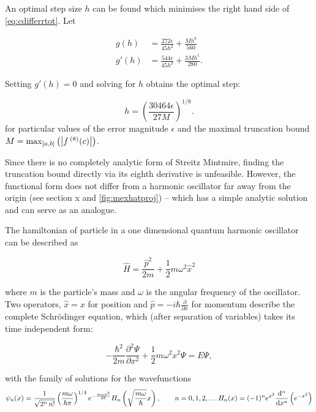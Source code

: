 An optimal step size $h$ can be found which minimises the right hand side of \cref{eq:cdifferrtot}. Let

\begin{align}
g(h) &= \frac{272\epsilon}{45h^2}+\frac{Mh^6}{560}\\[0.2cm]
g'(h) &= \frac{544\epsilon}{45h^3}+\frac{3Mh^5}{280}.
\end{align}

Setting $g'(h) = 0$ and solving for $h$ obtains the optimal step:

\begin{equation}
h = \left(\frac{30464\epsilon}{27M}\right)^{1/8}.\label{eq:stepgen}
\end{equation}
for particular values of the error magnitude $\epsilon$ and the maximal truncation bound $M = \mathrm{max}_{[a,b]}\left(\left\lvert f\,^{(8)}(c)\right\rvert\right)$.

Since there is no completely analytic form of Streitz Mintmire, finding the truncation bound directly via its eighth derivative is unfeasible.
However, the functional form does not differ from a harmonic oscillator far away from the origin (see section x and \cref{fig:mexhatproj}) -- which has a simple analytic solution and can serve as an analogue.

The hamiltonian of particle in a one dimensional quantum harmonic oscillator can be described as

\begin{equation}
\widehat{H} = \frac{\widehat{p}^2}{2m}+\frac{1}{2}m\omega^2\widehat{x}^2\label{eq:hamho}
\end{equation}

where $m$ is the particle's mass and $ω$ is the angular frequency of the oscillator.
Two operators, $\widehat{x} = x$ for position and $\widehat{p} = -i\hbar \frac{\partial}{\partial x}$ for momentum describe the complete Schr\"{o}dinger equation, which (after separation of variables) takes its time independent form:

\begin{equation}
-\frac{\hbar^2}{2m}\frac{\partial^2 \Psi}{\partial x^2}+\frac{1}{2}m\omega^2x^2 \Psi = E\Psi,
\end{equation}

with the family of solutions for the wavefunctions
\begin{equation}\psi_n(x) = \frac{1}{\sqrt{2^n\,n!}}\left(\frac{m\omega}{\hbar\pi}\right)^{1/4}e^{
- \frac{m\omega x^2}{2 \hbar}} H_n\left(\sqrt{\frac{m\omega}{\hbar}} x \right),\qquad n = 0,1,2,\ldots\\
H_n(x)=(-1)^n e^{x^2}\frac{\mathrm{d}^n}{\mathrm{d}x^n}\left(e^{-x^2}\right)
\end{equation}

